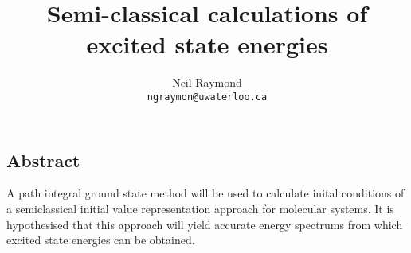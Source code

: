 \documentclass[12pt,letterpaper,oneside,final,titlepage]{article}               %
\numberwithin{equation}{section} %
\begin{document}
	\title{Semi-classical calculations of excited state energies}
	\author{Neil Raymond
	       \\ \texttt{ngraymon@uwaterloo.ca}}
    \date{}
    \maketitle

\doublespacing

\subsection*{Abstract}
A path integral ground state method will be used to calculate inital conditions of a semiclassical initial value representation approach for molecular systems. 
It is hypothesised that this approach will yield accurate energy spectrums from which excited state energies can be obtained. 
\end{document}
